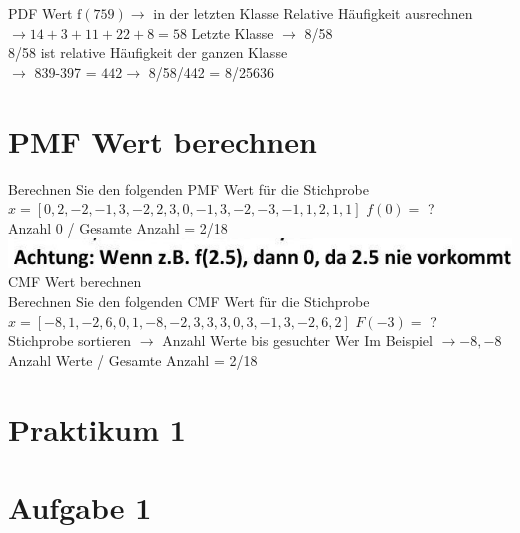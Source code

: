 \documentclass[10pt]{article}
\begin{document}
PDF Wert $\mathrm{f}(759) \rightarrow$ in der letzten Klasse Relative Häufigkeit ausrechnen $\rightarrow 14+3+11+22+8=58$ Letzte Klasse $\rightarrow$ 8/58\\
8/58 ist relative Häufigkeit der ganzen Klasse\\
$\rightarrow$ 839-397 = $442 \rightarrow$ 8/58/442 = 8/25636

\section*{PMF Wert berechnen}
Berechnen Sie den folgenden PMF Wert für die Stichprobe\\
$x=[0,2,-2,-1,3,-2,2,3,0,-1,3,-2,-3,-1,1,2,1,1]$ $f(0)=$ ?\\
Anzahl 0 / Gesamte Anzahl = 2/18\\
\includegraphics[width=\linewidth]{images/2024_12_29_0906b02acf849bda8665g-2} CMF Wert berechnen\\
Berechnen Sie den folgenden CMF Wert für die Stichprobe $x=[-8,1,-2,6,0,1,-8,-2,3,3,3,0,3,-1,3,-2,6,2]$ $F(-3)=$ ?\\
Stichprobe sortieren $\rightarrow$ Anzahl Werte bis gesuchter Wer Im Beispiel $\rightarrow-8,-8$\\
Anzahl Werte / Gesamte Anzahl = 2/18

\section*{Praktikum 1}
\section*{Aufgabe 1}
\end{document}
